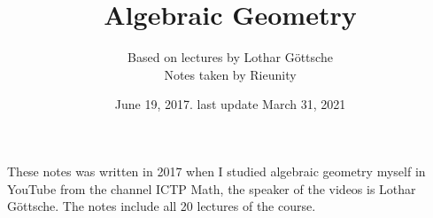 \documentclass[paper,12pt]{article}
\theoremstyle{plain}
\begin{document}
\title{Algebraic Geometry}
\author{Based on lectures by Lothar G\"{o}ttsche\\
\small Notes taken by Rieunity}
\date{June 19, 2017. last update March 31, 2021}
\maketitle
\thispagestyle{empty}

    These notes was written in 2017 when I studied algebraic geometry myself in YouTube from the channel ICTP Math, the speaker of the videos is  Lothar G\"{o}ttsche. The notes include all 20 lectures of the course.
\tableofcontents

\end{document}

